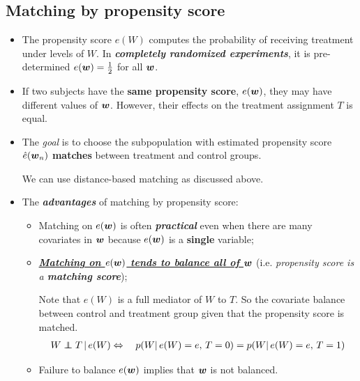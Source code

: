 \documentclass[11pt]{article}
\begin{document}
\subsection{Matching by propensity score}
\begin{itemize}
\item The propensity score $e(W)$ computes the probability of receiving treatment under levels of $W$.  In \emph{\textbf{completely randomized experiments}}, it is pre-determined $e(\boldsymbol{w}) = \frac{1}{2}$ for all $\boldsymbol{w}$.

\item If two subjects have the \textbf{same propensity score}, $e(\boldsymbol{w})$, they may have different values of $\boldsymbol{w}$. However, their effects on the treatment assignment $T$ is equal. 


\item The \emph{goal} is to choose the subpopulation with estimated propensity score $\hat{e}(\boldsymbol{w}_{n})$ \textbf{matches} between treatment and control groups.

 We can use distance-based matching as discussed above.

\item The \textbf{\emph{advantages}} of matching by propensity score:
\begin{itemize}
\item Matching on $e(\boldsymbol{w})$ is often \emph{\textbf{practical}} even when there are many covariates in $\boldsymbol{w}$ because $e(\boldsymbol{w})$  is a \textbf{single} variable;
\item \underline{\textbf{\emph{Matching on $e(\boldsymbol{w})$ tends to balance all of $\boldsymbol{w}$}}} (i.e. \emph{propensity score is a \textbf{matching score}});

Note that $e(W)$ is a full mediator of $W$ to $T$. So the covariate balance between control and treatment group given that the propensity score is matched.
\begin{align*}
W \indep T \,|\,e(W) \Leftrightarrow \quad p(W |\,e(W) = e,\, T= 0) = p(W |\,e(W) = e,\, T= 1)
\end{align*}

\item Failure to balance $e(\boldsymbol{w})$ implies that $\boldsymbol{w}$ is not balanced.
\end{itemize}


\end{itemize}
\end{document}
